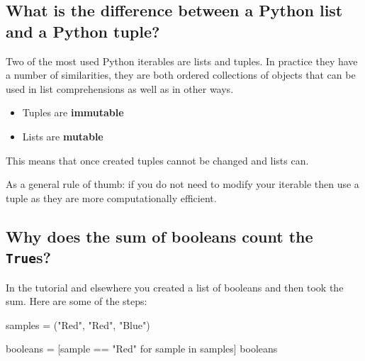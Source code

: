 \subsection{What is the difference between a Python list and a Python tuple?}
\label{sec:what_is_the_difference_between_a_python_list_and_a_python_tuple}

Two of the most used Python iterables are lists and tuples. In practice they
have a number of similarities, they are both ordered collections of objects that
can be used in list comprehensions as well as in other ways.
\begin{itemize}
\item 

Tuples are \textbf{immutable}

\item 

Lists are \textbf{mutable}

\end{itemize}


This means that once created tuples cannot be changed and lists can.


As a general rule of thumb: if you do not need to modify your iterable then use
a tuple as they are more computationally efficient.



\subsection{Why does the sum of booleans count the \texttt{True}s?}
\label{\detokenize{tools-for-mathematics/06-probability/why/main:why-does-the-sum-of-booleans-counts-the-trues}}

In the tutorial and elsewhere you created a list of booleans and then took the
sum. Here are some of the steps:




\begin{pyin}
samples = ("Red", "Red", "Blue")
\end{pyin}







\begin{pyin}
booleans = [sample == "Red" for sample in samples]
booleans
\end{pyin}





\begin{raw}
\end{raw}





